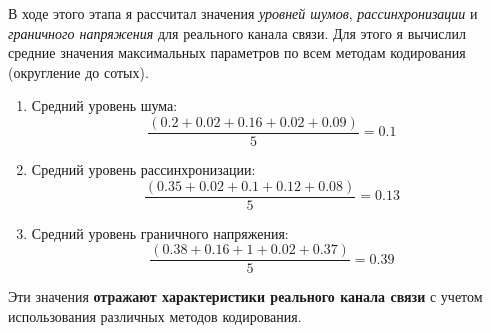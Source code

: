 В ходе этого этапа я рассчитал значения \textit{уровней шумов}, \textit{рассинхронизации} и \textit{граничного напряжения} для реального канала связи. Для этого я вычислил средние значения максимальных параметров по всем методам кодирования (округление до сотых).

\begin{enumerate}
	\item Средний уровень шума:
	      \[
		      \frac{(0.2+0.02+0.16+0.02+0.09)}{5}=0.1
	      \]

	\item Средний уровень рассинхронизации:
	      \[
		      \frac{(0.35+0.02+0.1+0.12+0.08)}{5}=0.13
	      \]

	\item Средний уровень граничного напряжения:
	      \[
		      \frac{(0.38+0.16+1+0.02+0.37)}{5}=0.39
	      \]

\end{enumerate}

Эти значения \textbf{отражают характеристики реального канала связи} с учетом использования различных методов кодирования.
